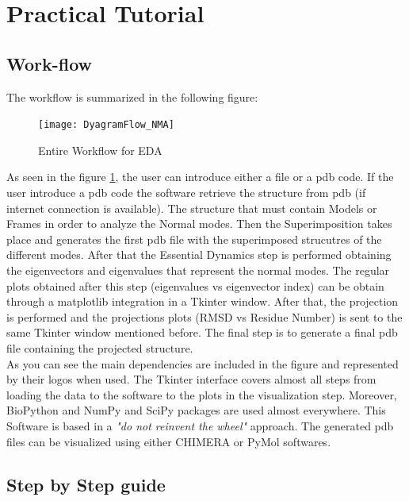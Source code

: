 \documentclass[12pt]{article}
\begin{document}
\section{Practical Tutorial}
\subsection{Work-flow}
The workflow is summarized in the following figure:

\vspace{1cm}
\begin{figure}[h]
\centering
\texttt{[image: DyagramFlow\_NMA]}
\caption{Entire Workflow for EDA}
\label{fig:workflow}
\end{figure}
As seen in the figure \ref{fig:workflow}, the user can introduce either a file or a pdb code. If the user introduce a pdb code the software retrieve the structure from pdb (if internet connection is available). The structure that must contain Models or Frames in order to analyze the Normal modes. Then the Superimposition takes place and generates the first pdb file with the superimposed strucutres of the different modes. After that the Essential Dynamics step is performed obtaining the eigenvectors and eigenvalues that represent the normal modes. The regular plots obtained after this step (eigenvalues vs eigenvector index) can be obtain through a matplotlib integration in a Tkinter window. After that, the projection is performed and the projections plots (RMSD vs Residue Number) is sent to the same Tkinter window mentioned before. The final step is to generate a final pdb file containing the projected structure.\\

As you can see the main dependencies are included in the figure and represented by their logos when used. The Tkinter interface covers almost all steps from loading the data to the software to the plots in the visualization step. Moreover, BioPython\citep{Cock2009} and NumPy and SciPy\citep{VanderWalt2011} packages are used almost everywhere. This Software is based in a \textit{"do not reinvent the wheel"} approach. The generated pdb files can be visualized using either CHIMERA or PyMol softwares. 

\subsection{Step by Step guide}
\end{document}
